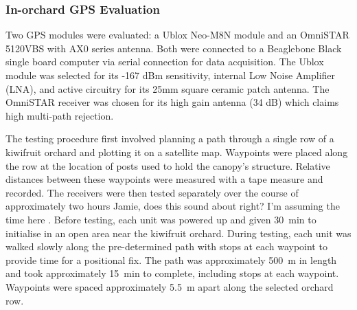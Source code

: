 \documentclass[preprint,authoryear,12pt]{elsarticle}
\begin{document}

    \subsubsection{In-orchard GPS Evaluation}
        Two GPS modules were evaluated: a Ublox Neo-M8N module and an OmniSTAR 5120VBS with AX0 series antenna.
    	Both were connected to a Beaglebone Black single board computer via serial connection for data acquisition.
        The Ublox module was selected for its -167 dBm sensitivity, internal Low Noise Amplifier (LNA), and active circuitry for its 25mm square ceramic patch antenna.
        The OmniSTAR receiver was chosen for its high gain antenna (34 dB) which claims high multi-path rejection.

        The testing procedure first involved planning a path through a single row of a kiwifruit orchard and plotting it on a satellite map.
        Waypoints were placed along the row at the location of posts used to hold the canopy's structure.
        Relative distances between these waypoints were measured with a tape measure and recorded.
        The receivers were then tested separately over the course of approximately two hours \color{red} Jamie, does this sound about right? I'm assuming the time here \color{black}.
        Before testing, each unit was powered up and given \SI{30}{\minute} to initialise in an open area near the kiwifruit orchard.
        During testing, each unit was walked slowly along the pre-determined path with stops at each waypoint to provide time for a positional fix.
        The path was approximately \SI{500}{\meter} in length and took approximately \SI{15}{\minute} to complete, including stops at each waypoint.
        Waypoints were spaced approximately \SI{5.5}{\meter} apart along the selected orchard row.
\end{document}
